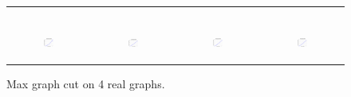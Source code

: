 \begin{figure}[ht]
\begin{tabular}{cccc}
\begin{subfigure}[b]{0.22\textwidth}
	  \end{subfigure} \\
	  \begin{subfigure}[b]{0.22\textwidth}
	  	\includegraphics[width=110pt]{images/validated_CC2G_friendster10M_maxgraphcut.pdf}
			\caption{}
			\label{appfig:validated_CC2G_friendster10M_maxgraphcut}
	  \end{subfigure} &
	  \begin{subfigure}[b]{0.22\textwidth}
	  	\includegraphics[width=110pt]{images/validated_CC2G_arabic2005_maxgraphcut.pdf}
			\caption{}
			\label{appfig:validated_CC2G_arabic2005_maxgraphcut}
	  \end{subfigure} &
	  \begin{subfigure}[b]{0.22\textwidth}
	  	\includegraphics[width=110pt]{images/validated_CC2G_uk2005_maxgraphcut.pdf}
			\caption{}
			\label{appfig:validated_CC2G_uk2005_maxgraphcut}
	  \end{subfigure} &
	  \begin{subfigure}[b]{0.22\textwidth}
	  	\includegraphics[width=110pt]{images/validated_CC2G_it2004_maxgraphcut.pdf}
			\caption{}
			\label{appfig:validated_CC2G_it2004_maxgraphcut}
	  \end{subfigure} \\
  \end{tabular}
  \caption{Max graph cut on 4 real graphs.}
\end{figure}





